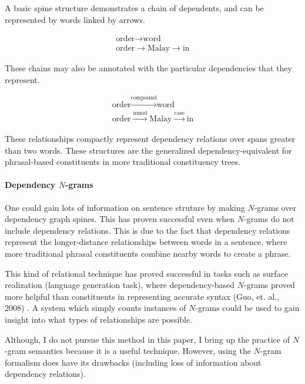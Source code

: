\documentclass[twoside]{article}
\begin{document}
A basic spine structure demonstrates a chain of dependents, and can be represented by words linked by arrows.

\begin{eqnarray} \label{eq:spea1}
\text{order} \longrightarrow \text{word} \\
\text{order} \longrightarrow \text{Malay} \longrightarrow \text{in}
\end{eqnarray}

These chains may also be annotated with the particular dependencies that they represent.

\begin{eqnarray}
\text{order} \overset{\text{compound}}{\longrightarrow} \text{word} \\
{ \text{order} \overset{\text{nmod}}{\longrightarrow} \text{Malay} \overset{\text{case}}{\longrightarrow} \text{in}
\label{eq:spea2} }
\end{eqnarray}

These relationships compactly represent dependency relations over spans greater than two words.  These structures are the generalized dependency-equivalent for phrasal-based constituents in more traditional constituency trees.

\paragraph{Dependency $N$-grams} One could gain lots of information on sentence struture by making $N$-grams over dependency graph spines.  This has proven successful even when $N$-grams do not include dependency relations.  This is due to the fact that dependency relations represent the longer-distance relationships between words in a sentence, where more traditional phrasal constituents combine nearby words to create a phrase.

This kind of relational technique has proved successful in tasks such as surface realization (language generation task), where dependency-based $N$-grams proved more helpful than constituents in representing accurate syntax (Guo, et. al., 2008) \cite{guo08}.  A system which simply counts instances of $N$-grams could be used to gain insight into what types of relationships are possible.

Although, I do not pursue this method in this paper, I bring up the practice of $N$-gram semantics because it is a useful technique.  However, using the $N$-gram formalism does have its drawbacks (including loss of information about dependency relations).
\end{document}
